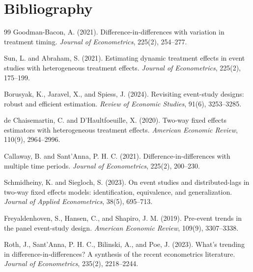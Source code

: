 \documentclass[11pt]{article}
\theoremstyle{definition}
\theoremstyle{plain}
\theoremstyle{remark}
\begin{document}
\section*{Bibliography}
\begin{thebibliography}{99}
Goodman-Bacon, A. (2021).
Difference-in-differences with variation in treatment timing.
\emph{Journal of Econometrics}, 225(2), 254--277.

Sun, L. and Abraham, S. (2021).
Estimating dynamic treatment effects in event studies with heterogeneous treatment effects.
\emph{Journal of Econometrics}, 225(2), 175--199.

Borusyak, K., Jaravel, X., and Spiess, J. (2024).
Revisiting event-study designs: robust and efficient estimation.
\emph{Review of Economic Studies}, 91(6), 3253--3285.

de Chaisemartin, C. and D'Haultfoeuille, X. (2020).
Two-way fixed effects estimators with heterogeneous treatment effects.
\emph{American Economic Review}, 110(9), 2964--2996.

Callaway, B. and Sant'Anna, P. H. C. (2021).
Difference-in-differences with multiple time periods.
\emph{Journal of Econometrics}, 225(2), 200--230.

Schmidheiny, K. and Siegloch, S. (2023).
On event studies and distributed-lags in two-way fixed effects models: identification, equivalence, and generalization.
\emph{Journal of Applied Econometrics}, 38(5), 695--713.

Freyaldenhoven, S., Hansen, C., and Shapiro, J. M. (2019).
Pre-event trends in the panel event-study design.
\emph{American Economic Review}, 109(9), 3307--3338.

Roth, J., Sant'Anna, P. H. C., Bilinski, A., and Poe, J. (2023).
What's trending in difference-in-differences? A synthesis of the recent econometrics literature.
\emph{Journal of Econometrics}, 235(2), 2218--2244.
\end{thebibliography}
\end{document}
